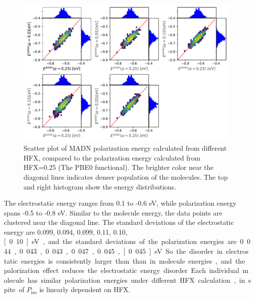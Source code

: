 \documentclass[letterpaper,12pt]{article}
\begin{document}
\begin{figure}[H]
    \centering
    \includegraphics[width=0.99\textwidth]{figs/scatterEdip_qmmm.pdf}
    \caption{Scatter plot of MADN polarization energy calculated from different HFX, compared to the polarization energy calculated from HFX=0.25 (The PBE0 functional). The brighter color near the diagonal lines indicates denser population of the molecules.  The top and right histogram show the energy distributions.}
    \label{fig:Edip_qmmm_MADN}
\end{figure}

The electrostatic energy ranges from 0.1 to -0.6 eV, while polarization energy spans -0.5 to -0.8 eV.  Similar to the molecule energy, the data points are clustered near the diagonal line. 
The standard deviations of the electrostatic energy are 0.099, 0.094, 0.099, 0.11, 0.10, \unit[0.10]{eV}, and the standard deviations of the polarization energies are 0.044, 0.043, 0.043, 0.047, 0.045, \unit[0.045]{eV}. So the disorder in electrostatic energies is consistently larger than than in molecule energies, and the palorization effect reduces the electrostatic energy disorder. 
Each individual molecule has similar polarization energies under different HFX calculation, in spite of $P_\text{iso}$ is linearly dependent on HFX. 
\end{document}
